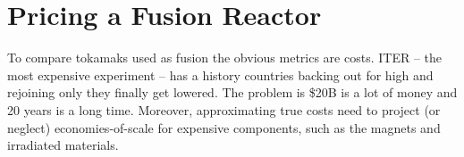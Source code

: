 %
%		
%
%

\section{Pricing a Fusion Reactor}

To  compare tokamaks used as fusion  the obvious metrics are costs. ITER -- the  most expensive experiment  -- has a history  countries backing out for high  and rejoining only  they finally get lowered.\cite{jeff} The problem is \$20B is a lot of money and 20 years is a long time. Moreover, approximating true costs  need to project (or neglect)  economies-of-scale for expensive components, such as the  magnets and irradiated materials.

